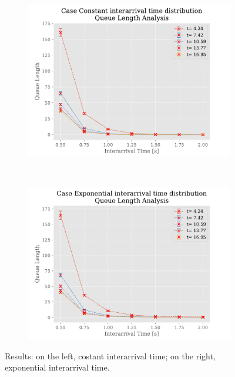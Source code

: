 \documentclass[a4paper,12pt]{article}
\begin{document}
\begin{figure}
\begin{subfigure}[b]{.45\textwidth}
    \includegraphics[width=\textwidth]{img/QueueLengthP2Const.pdf}
    \label{fig:exp:const:queue}
  \end{subfigure}
  ~
  \begin{subfigure}[b]{.45\textwidth}
    \includegraphics[width=\textwidth]{img/QueueLengthP2Exp.pdf}
    \label{fig:exp:exp:queue}
  \end{subfigure}
  \caption{Results: on the left, costant interarrival time; on the right, exponential interarrival time.}
  \label{fig:result-0}
\end{figure}
\end{document}
